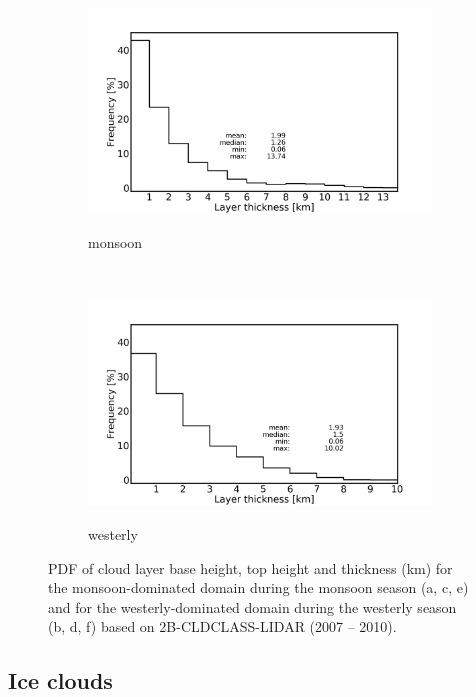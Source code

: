 \documentclass[alpha-refs]{wiley-article}
\begin{document}
\begin{figure}[!htbp]
    \begin{subfigure}[b]{0.5\textwidth}
        \centering
        \caption{monsoon }        
        \includegraphics[width=\textwidth]{layerthickness_pdf_monsoondomain_monsoonseason.png}
   \label{fig:pdf5}
    \end{subfigure}%
    ~ 
    \begin{subfigure}[b]{0.5\textwidth}
        \centering
        \caption{westerly}        
        \includegraphics[width=\textwidth]{layerthickness_pdf_westerlydomain_westerlyseason.png}
           \label{fig:pdf6}
        \end{subfigure}
        \caption{PDF of cloud layer base height, top height and thickness (km) for the monsoon-dominated domain during the monsoon season (a, c, e) and for the westerly-dominated domain during the westerly season (b, d, f) based on 2B-CLDCLASS-LIDAR (2007 -- 2010).}
\label{fig:pdf}
\end{figure}  


\subsection{Ice clouds}
\end{document}
